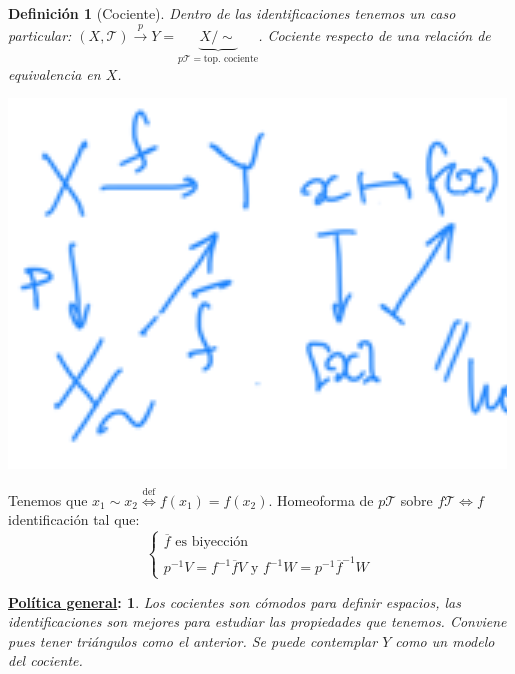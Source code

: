 \documentclass[10pt,a4paper,openright]{book}
\theoremstyle{break}
\newtheorem*{defi}{Definición}
\newtheorem*{pg}{\underline{Política general}:}
\begin{document}
\begin{defi}[Cociente]
Dentro de las identificaciones tenemos un caso particular: $\left( X, \mathcal{T} \right) \stackrel{p}{\rightarrow} Y = \underbrace{X / \sim}_{p \mathcal{T} = \text{top. cociente}}$. Cociente respecto de una relación de equivalencia en $X$. 
\end{defi}
\begin{center}
    \includegraphics[scale=0.2]{images/def_cociente} 
\end{center}
Tenemos que $x_1 \sim x_2 \stackrel{\text{def}}{\Leftrightarrow} f\left( x_1 \right) = f\left( x_2 \right)$. Homeoforma de $p\mathcal{T}$ sobre $f\mathcal{T} \Leftrightarrow f$ identificación tal que:
\[
\begin{cases}
    \overline{f} \text{ es biyección}\\
    p^{-1}V = f^{-1}\overline{f} V \text{ y } f^{-1}W = p^{-1} \overline{f}^{-1}W
\end{cases} 
\]

\begin{pg}
    Los cocientes son cómodos para definir espacios, las identificaciones son mejores para estudiar las propiedades que tenemos. Conviene pues tener triángulos como el anterior. Se puede contemplar $Y$ como un modelo del cociente.
\end{pg}
\end{document}
